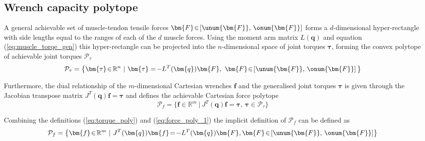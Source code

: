 \subsection{Wrench capacity polytope}\label{ch:wrench_feasabiliy_definition}

A general achievable set of muscle-tendon tensile forces  $\bm{F}\!\in\!\left[\unum{\bm{F}},\,\onum{\bm{F}}\right] $ forms a $d$-dimensional hyper-rectangle 
with side lengths equal to the ranges of each of the $d$ muscle forces. Using the moment arm matrix $L(\bm{q})$ and equation (\ref{eq:muscle_torqe_gen}) this hyper-rectangle can be projected into the $n$-dimensional space of joint torques $\bm{\tau}$, forming the convex polytope of achievable joint torques $\mathcal{P}_\tau$
\begin{equation}
    \mathcal{P}_\tau = \big\{ \bm{\tau}\! \in\! \mathbb{R}^{n} ~ | ~ \bm{\tau} =\! -L^{T}(\bm{q})\bm{F}, ~ \bm{F}\! \in\! \left[\unum{\bm{F}},\,\onum{\bm{F}}\right] \big\}
    \label{eq:torque_poly}
\end{equation}

Furthermore, the dual relationship of the $m$-dimensional Cartesian wrenches $\bm{f}$ and the generalised joint torques $\bm{\tau}$ is given through the Jacobian transpose matrix $J^{T}(\bm{q})\bm{f}\! = \!\bm{\tau}$ and defines the achievable Cartesian force polytope
\begin{equation}
    \mathcal{P}_f = \big\{ \bm{f}\! \in\! \mathbb{R}^{m} ~ | ~ J^{T}(\bm{q})\bm{f}\! =\! \bm{\tau}, ~ \bm{\tau}\! \in\! \mathcal{P}_\tau \big\}
    \label{eq:force_poly_1}
\end{equation}

Combining the definitions (\ref{eq:torque_poly}) and (\ref{eq:force_poly_1}) the implicit definition of $\mathcal{P}_f$ can be defined as
\begin{equation}
    \mathcal{P}_f = \left\{ \bm{f}\! \in\! \mathbb{R}^{m} ~ | ~ J^{T}(\bm{q})\bm{f}\! =\! -L^{T}(\bm{q})\bm{F}, \bm{F}\! \in\! \left[\unum{\bm{F}},\,\onum{\bm{F}}\right]\right\}
    \label{eq:full_polytope}
\end{equation}


